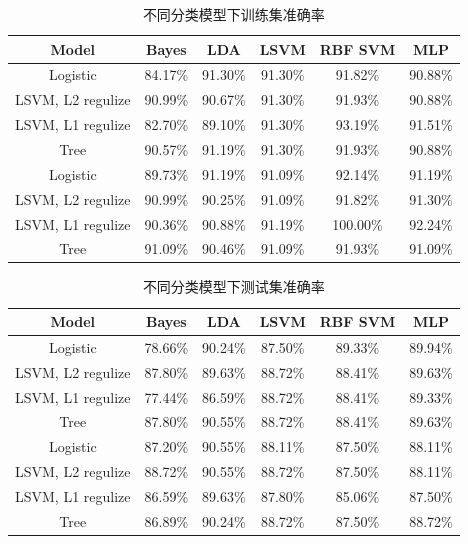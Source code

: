 	\begin{table}[htbp]
	\centering
	\begin{tabular}{cccccc}
	\toprule
	Model &   Bayes &     LDA &    LSVM &  RBF SVM &     MLP \\
	\midrule
	Logistic &  84.17\% &  91.30\% &  91.30\% &   91.82\% &  90.88\% \\
	LSVM, L2 regulize &  90.99\% &  90.67\% &  91.30\% &   91.93\% &  90.88\% \\
	LSVM, L1 regulize &  82.70\% &  89.10\% &  91.30\% &   93.19\% &  91.51\% \\
	Tree &  90.57\% &  91.19\% &  91.30\% &   91.93\% &  90.88\% \\
	\midrule
	Logistic &  89.73\% &  91.19\% &  91.09\% &   92.14\% &  91.19\% \\
	LSVM, L2 regulize &  90.99\% &  90.25\% &  91.09\% &   91.82\% &  91.30\% \\
	LSVM, L1 regulize &  90.36\% &  90.88\% &  91.19\% &  100.00\% &  92.24\% \\
	Tree &  91.09\% &  90.46\% &  91.09\% &   91.93\% &  91.09\% \\
	\bottomrule
	\end{tabular}
	\caption{不同分类模型下训练集准确率}
	\label{tab:modeltrain}
	\end{table}

	\begin{table}[htbp]
	\centering
	\begin{tabular}{cccccc}
	\toprule
	Model &   Bayes &     LDA &    LSVM & RBF SVM &     MLP \\
	\midrule
	Logistic &  78.66\% &  90.24\% &  87.50\% &  89.33\% &  89.94\% \\
	LSVM, L2 regulize &  87.80\% &  89.63\% &  88.72\% &  88.41\% &  89.63\% \\
	LSVM, L1 regulize &  77.44\% &  86.59\% &  88.72\% &  88.41\% &  89.33\% \\
	Tree &  87.80\% &  90.55\% &  88.72\% &  88.41\% &  89.63\% \\
	\midrule
	Logistic &  87.20\% &  90.55\% &  88.11\% &  87.50\% &  88.11\% \\
	LSVM, L2 regulize &  88.72\% &  90.55\% &  88.72\% &  87.50\% &  88.11\% \\
	LSVM, L1 regulize &  86.59\% &  89.63\% &  87.80\% &  85.06\% &  87.50\% \\
	Tree &  86.89\% &  90.24\% &  88.72\% &  87.50\% &  88.72\% \\
	\bottomrule
	\end{tabular}
	\caption{不同分类模型下测试集准确率}
	\label{tab:modeltest}
	\end{table}

